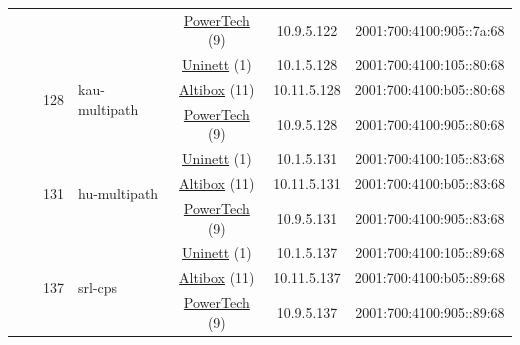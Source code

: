 \begin{small}
\begin{center}
\begin{longtable}{|c|c|c|c|c|c|c|c|}
  &  &  &  & \multicolumn{2}{|c|}{\tiny{\href{http://www.powertech.no}{PowerTech} (9)}} & \tiny{10.9.5.122} & \tiny{2001:700:4100:905::7a:68} \\* \cline{3-3}\cline{4-4}\cline{5-5}\cline{6-6}\cline{7-7}\cline{8-8}
  &  & \multirow{3}{*}{\tiny{128}} & \multicolumn{1}{|l|}{\multirow{3}{*}{\tiny{kau-multipath}}} & \multicolumn{2}{|c|}{\tiny{\href{https://www.uninett.no}{Uninett} (1)}} & \tiny{10.1.5.128} & \tiny{2001:700:4100:105::80:68} \\* \cline{5-5}\cline{6-6}\cline{7-7}\cline{8-8}
  &  &  &  & \multicolumn{2}{|c|}{\tiny{\href{https://www.altibox.no}{Altibox} (11)}} & \tiny{10.11.5.128} & \tiny{2001:700:4100:b05::80:68} \\* \cline{5-5}\cline{6-6}\cline{7-7}\cline{8-8}
  &  &  &  & \multicolumn{2}{|c|}{\tiny{\href{http://www.powertech.no}{PowerTech} (9)}} & \tiny{10.9.5.128} & \tiny{2001:700:4100:905::80:68} \\* \cline{3-3}\cline{4-4}\cline{5-5}\cline{6-6}\cline{7-7}\cline{8-8}
  &  & \multirow{3}{*}{\tiny{131}} & \multicolumn{1}{|l|}{\multirow{3}{*}{\tiny{hu-multipath}}} & \multicolumn{2}{|c|}{\tiny{\href{https://www.uninett.no}{Uninett} (1)}} & \tiny{10.1.5.131} & \tiny{2001:700:4100:105::83:68} \\* \cline{5-5}\cline{6-6}\cline{7-7}\cline{8-8}
  &  &  &  & \multicolumn{2}{|c|}{\tiny{\href{https://www.altibox.no}{Altibox} (11)}} & \tiny{10.11.5.131} & \tiny{2001:700:4100:b05::83:68} \\* \cline{5-5}\cline{6-6}\cline{7-7}\cline{8-8}
  &  &  &  & \multicolumn{2}{|c|}{\tiny{\href{http://www.powertech.no}{PowerTech} (9)}} & \tiny{10.9.5.131} & \tiny{2001:700:4100:905::83:68} \\* \cline{3-3}\cline{4-4}\cline{5-5}\cline{6-6}\cline{7-7}\cline{8-8}
  &  & \multirow{3}{*}{\tiny{137}} & \multicolumn{1}{|l|}{\multirow{3}{*}{\tiny{srl-cps}}} & \multicolumn{2}{|c|}{\tiny{\href{https://www.uninett.no}{Uninett} (1)}} & \tiny{10.1.5.137} & \tiny{2001:700:4100:105::89:68} \\* \cline{5-5}\cline{6-6}\cline{7-7}\cline{8-8}
  &  &  &  & \multicolumn{2}{|c|}{\tiny{\href{https://www.altibox.no}{Altibox} (11)}} & \tiny{10.11.5.137} & \tiny{2001:700:4100:b05::89:68} \\* \cline{5-5}\cline{6-6}\cline{7-7}\cline{8-8}
  &  &  &  & \multicolumn{2}{|c|}{\tiny{\href{http://www.powertech.no}{PowerTech} (9)}} & \tiny{10.9.5.137} & \tiny{2001:700:4100:905::89:68} \\* \cline{3-3}\cline{4-4}\cline{5-5}\cline{6-6}\cline{7-7}\cline{8-8}

\end{longtable}
\end{center}
\end{small}
